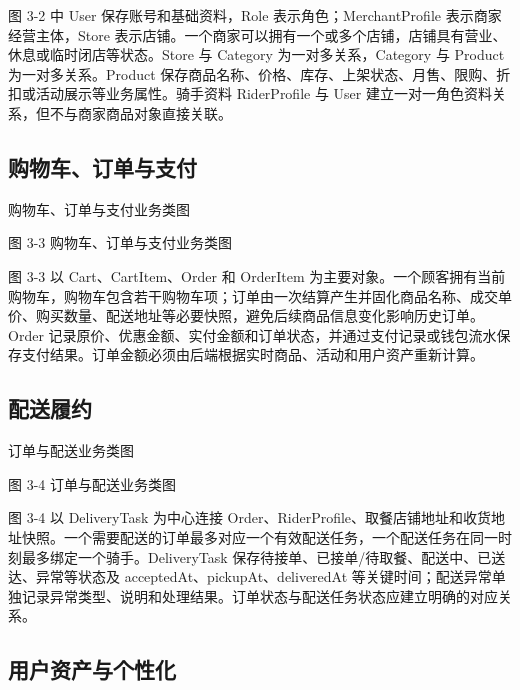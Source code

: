 图 3-2 中 User 保存账号和基础资料，Role 表示角色；MerchantProfile 表示商家经营主体，Store 表示店铺。一个商家可以拥有一个或多个店铺，店铺具有营业、休息或临时闭店等状态。Store 与 Category 为一对多关系，Category 与 Product 为一对多关系。Product 保存商品名称、价格、库存、上架状态、月售、限购、折扣或活动展示等业务属性。骑手资料 RiderProfile 与 User 建立一对一角色资料关系，但不与商家商品对象直接关联。

\subsection{购物车、订单与支付}

购物车、订单与支付业务类图

\begin{center}
\end{center}

图 3-3  购物车、订单与支付业务类图

图 3-3 以 Cart、CartItem、Order 和 OrderItem 为主要对象。一个顾客拥有当前购物车，购物车包含若干购物车项；订单由一次结算产生并固化商品名称、成交单价、购买数量、配送地址等必要快照，避免后续商品信息变化影响历史订单。Order 记录原价、优惠金额、实付金额和订单状态，并通过支付记录或钱包流水保存支付结果。订单金额必须由后端根据实时商品、活动和用户资产重新计算。

\subsection{配送履约}

订单与配送业务类图

\begin{center}
\end{center}

图 3-4  订单与配送业务类图

图 3-4 以 DeliveryTask 为中心连接 Order、RiderProfile、取餐店铺地址和收货地址快照。一个需要配送的订单最多对应一个有效配送任务，一个配送任务在同一时刻最多绑定一个骑手。DeliveryTask 保存待接单、已接单/待取餐、配送中、已送达、异常等状态及 acceptedAt、pickupAt、deliveredAt 等关键时间；配送异常单独记录异常类型、说明和处理结果。订单状态与配送任务状态应建立明确的对应关系。

\subsection{用户资产与个性化}


